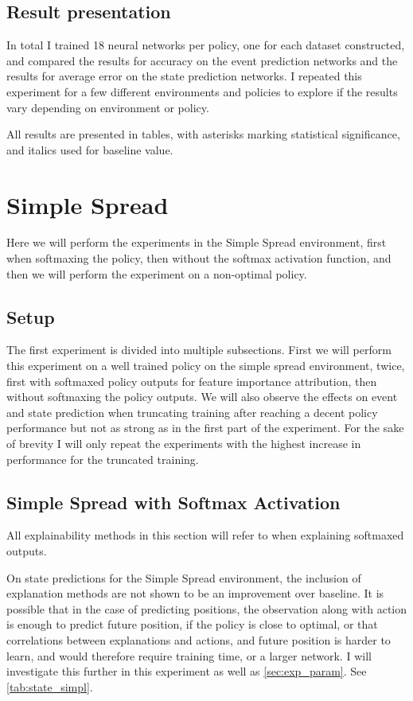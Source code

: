 \documentclass[UKenglish]{uiomasterthesis}
\begin{document}
\subsection{Result presentation}
In total I trained 18 neural networks per policy, one for each dataset constructed, and compared the results for accuracy on the event prediction networks and the results for average error on the state prediction networks. I repeated this experiment for a few different environments and policies to explore if the results vary depending on environment or policy.

All results are presented in tables, with asterisks marking statistical significance, and italics used for baseline value.

\section{Simple Spread}
\label{sec:exp_simpl}
Here we will perform the experiments in the Simple Spread environment, first when softmaxing the policy, then without the softmax activation function, and then we will perform the experiment on a non-optimal policy.

\subsection{Setup}
The first experiment is divided into multiple subsections. First we will perform this experiment on a well trained policy on the simple spread environment, twice, first with softmaxed policy outputs for feature importance attribution, then without softmaxing the policy outputs. We will also observe the effects on event and state prediction when truncating training after reaching a decent policy performance but not as strong as in the first part of the experiment. For the sake of brevity I will only repeat the experiments with the highest increase in performance for the truncated training.

\subsection{Simple Spread with Softmax Activation}
All explainability methods in this section will refer to when explaining softmaxed outputs.


On state predictions for the Simple Spread environment, the inclusion of explanation methods are not shown to be an improvement over baseline. It is possible that in the case of predicting positions, the observation along with action is enough to predict future position, if the policy is close to optimal, or that correlations between explanations and actions, and future position is harder to learn, and would therefore require training time, or a larger network. I will investigate this further in this experiment as well as \cref{sec:exp_param}. See \cref{tab:state_simpl}.
\end{document}

